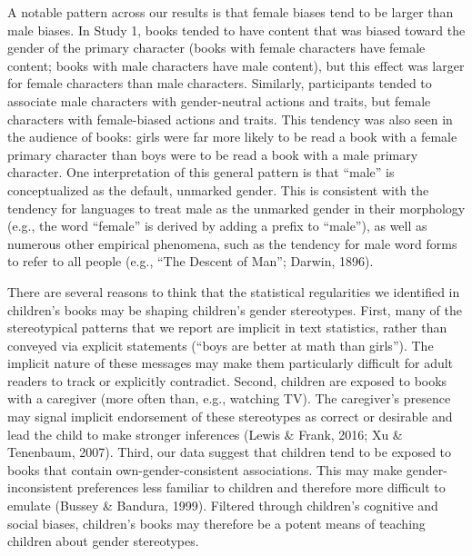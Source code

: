 \documentclass[
  english,
  ,man,floatsintext]{apa6}
\begin{document}
A notable pattern across our results is that female biases tend to be larger than male biases. In Study 1, books tended to have content that was biased toward the gender of the primary character (books with female characters have female content; books with male characters have male content), but this effect was larger for female characters than male characters. Similarly, participants tended to associate male characters with gender-neutral actions and traits, but female characters with female-biased actions and traits. This tendency was also seen in the audience of books: girls were far more likely to be read a book with a female primary character than boys were to be read a book with a male primary character. One interpretation of this general pattern is that ``male'' is conceptualized as the default, unmarked gender. This is consistent with the tendency for languages to treat male as the unmarked gender in their morphology (e.g., the word ``female'' is derived by adding a prefix to ``male''), as well as numerous other empirical phenomena, such as the tendency for male word forms to refer to all people (e.g., {``The Descent of Man''}; Darwin, 1896).

There are several reasons to think that the statistical regularities we identified in children's books may be shaping children's gender stereotypes. First, many of the stereotypical patterns that we report are implicit in text statistics, rather than conveyed via explicit statements (``boys are better at math than girls''). The implicit nature of these messages may make them particularly difficult for adult readers to track or explicitly contradict. Second, children are exposed to books with a caregiver (more often than, e.g., watching TV). The caregiver's presence may signal implicit endorsement of these stereotypes as correct or desirable and lead the child to make stronger inferences (Lewis \& Frank, 2016; Xu \& Tenenbaum, 2007). Third, our data suggest that children tend to be exposed to books that contain own-gender-consistent associations. This may make gender-inconsistent preferences less familiar to children and therefore more difficult to emulate (Bussey \& Bandura, 1999). Filtered through children's cognitive and social biases, children's books may therefore be a potent means of teaching children about gender stereotypes.
\end{document}
